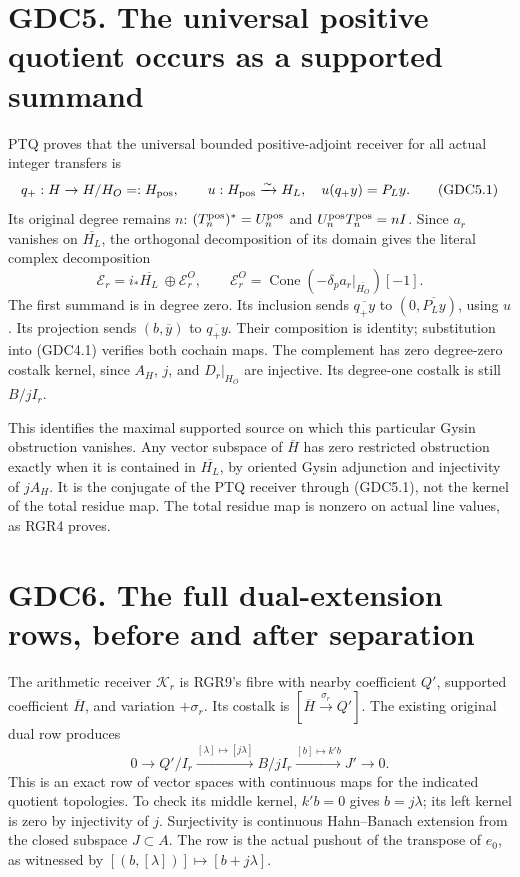 \section{GDC5. The universal positive quotient occurs as a supported
summand}\label{gdc5.-the-universal-positive-quotient-occurs-as-a-supported-summand}

PTQ proves that the universal bounded positive-adjoint receiver for all
actual integer transfers is \[
q_+:H\to H/H_O=:H_{\rm pos},\qquad
u:H_{\rm pos}\xrightarrow{\sim}H_L,\quad u(q_+y)=P_Ly.
\tag{GDC5.1}
\] Its original degree remains \(n\):
\((T_n^{\rm pos})^*=U_n^{\rm pos}\) and
\(U_n^{\rm pos}T_n^{\rm pos}=nI\). Since \(a_r\) vanishes on
\(\overline{H_L}\), the orthogonal decomposition of its domain gives the
literal complex decomposition \[
\boxed{\mathscr E_r=i_*\overline{H_L}\ \oplus
\mathscr E_r^O,\qquad
\mathscr E_r^O=\operatorname{Cone}(-\delta_pa_r|_{\overline{H_O}})[-1].}
\tag{GDC5.2}
\] The first summand is in degree zero. Its inclusion sends
\(\overline{q_+y}\) to \((0,\overline{P_Ly})\), using \(u\). Its
projection sends \((b,\overline y)\) to \(\overline{q_+y}\). Their
composition is identity; substitution into (GDC4.1) verifies both
cochain maps. The complement has zero degree-zero costalk kernel, since
\(A_H\), \(j\), and \(D_r|_{H_O}\) are injective. Its degree-one costalk
is still \(B/jI_r\).

This identifies the maximal supported source on which this particular
Gysin obstruction vanishes. Any vector subspace of \(\overline H\) has
zero restricted obstruction exactly when it is contained in
\(\overline{H_L}\), by oriented Gysin adjunction and injectivity of
\(jA_H\). It is the conjugate of the PTQ receiver through (GDC5.1), not
the kernel of the total residue map. The total residue map is nonzero on
actual line values, as RGR4 proves.

\section{GDC6. The full dual-extension rows, before and after
separation}\label{gdc6.-the-full-dual-extension-rows-before-and-after-separation}

The arithmetic receiver \(\mathscr K_r\) is RGR9's fibre with nearby
coefficient \(Q'\), supported coefficient \(\overline H\), and variation
\(+\sigma_r\). Its costalk is \([\overline H\xrightarrow{\sigma_r}Q']\).
The existing original dual row produces \[
0\to Q'/I_r\xrightarrow{[\lambda]\mapsto[j\lambda]}
B/jI_r\xrightarrow{[b]\mapsto k'b}J'\to0.
\tag{GDC6.1}
\] This is an exact row of vector spaces with continuous maps for the
indicated quotient topologies. To check its middle kernel, \(k'b=0\)
gives \(b=j\lambda\); its left kernel is zero by injectivity of \(j\).
Surjectivity is continuous Hahn--Banach extension from the closed
subspace \(J\subset A\). The row is the actual pushout of the transpose
of \(e_0\), as witnessed by \([(b,[\lambda])]\mapsto[b+j\lambda]\).

